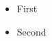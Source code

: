 \documentclass{article}
\begin{document}
\begin{itemize}
\item First
\item Second \foo
\end{itemize}
\end{document}
